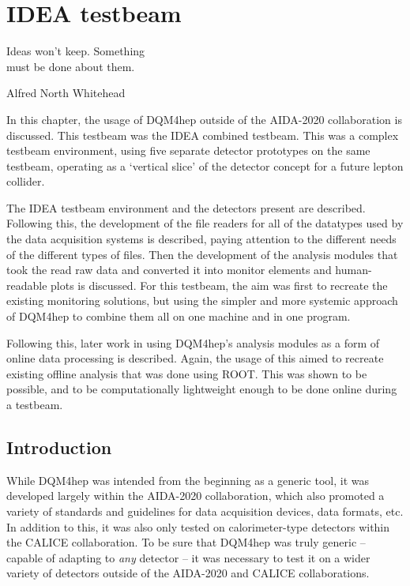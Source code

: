 
\chapter{\acrshort{IDEA} testbeam}
\label{chapter:ideatestbeam}

\epigraph{Ideas won't keep. Something \\ must be done about them.}{Alfred North Whitehead}

In this chapter, the usage of \acrshort{DQM4hep} outside of the \acrshort{AIDA}-2020 collaboration is discussed. This testbeam was the \acrfull{IDEA} combined testbeam. This was a complex testbeam environment, using five separate detector prototypes on the same testbeam, operating as a `vertical slice' of the detector concept for a future lepton collider.

The \acrshort{IDEA} testbeam environment and the detectors present are described. Following this, the development of the file readers for all of the datatypes used by the data acquisition systems is described, paying attention to the different needs of the different types of files. Then the development of the analysis modules that took the read raw data and converted it into monitor elements and human-readable plots is discussed. For this testbeam, the aim was first to recreate the existing monitoring solutions, but using the simpler and more systemic approach of \acrshort{DQM4hep} to combine them all on one machine and in one program. 

Following this, later work in using \acrshort{DQM4hep}'s analysis modules as a form of online data processing is described. Again, the usage of this aimed to recreate existing offline analysis that was done using ROOT. This was shown to be possible, and to be computationally lightweight enough to be done online during a testbeam.

\section{Introduction}
While \acrshort{DQM4hep} was intended from the beginning as a generic tool, it was developed largely within the \acrshort{AIDA}-2020 collaboration, which also promoted a variety of standards and guidelines for data acquisition devices, data formats, etc. In addition to this, it was also only tested on calorimeter-type detectors within the \acrshort{CALICE} collaboration. To be sure that \acrshort{DQM4hep} was truly generic -- capable of adapting to \textit{any} detector -- it was necessary to test it on a wider variety of detectors outside of the \acrshort{AIDA}-2020 and \acrshort{CALICE} collaborations.

